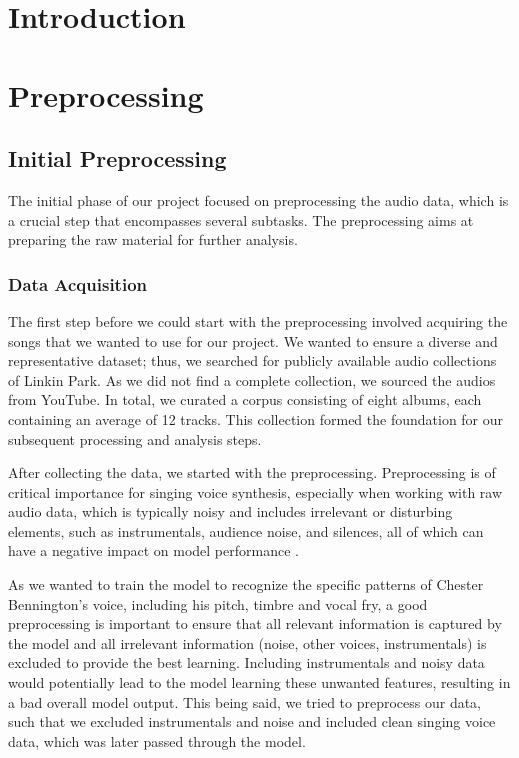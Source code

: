 \documentclass[a4paper]{article}
\subtitle \\
\author{\StudNumeOne}
\begin{document}
\section*{Introduction}


\section{Preprocessing}

\subsection{Initial Preprocessing}
The initial phase of our project focused on preprocessing the audio data, which is a crucial step that encompasses several subtasks. The preprocessing aims at preparing the raw material for further analysis.

\subsubsection{Data Acquisition}
The first step before we could start with the preprocessing involved acquiring the songs that we wanted to use for our project. We wanted to ensure a diverse and representative dataset; thus, we searched for publicly available audio collections of Linkin Park. As we did not find a complete collection, we sourced the audios from YouTube. In total, we curated a corpus consisting of eight albums, each containing an average of 12 tracks. This collection formed the foundation for our subsequent processing and analysis steps.

After collecting the data, we started with the preprocessing. Preprocessing is of critical importance for singing voice synthesis, especially when working with raw audio data, which is typically noisy and includes irrelevant or disturbing elements, such as instrumentals, audience noise, and silences, all of which can have a negative impact on model performance \cite{Kulkarni2023}.

As we wanted to train the model to recognize the specific patterns of Chester Bennington’s voice, including his pitch, timbre and vocal fry, a good preprocessing is important to ensure that all relevant information is captured by the model and all irrelevant information (noise, other voices, instrumentals) is excluded to provide the best learning. Including instrumentals and noisy data would potentially lead to the model learning these unwanted features, resulting in a bad overall model output. This being said, we tried to preprocess our data, such that we excluded instrumentals and noise and included clean singing voice data, which was later passed through the model.
\end{document}
